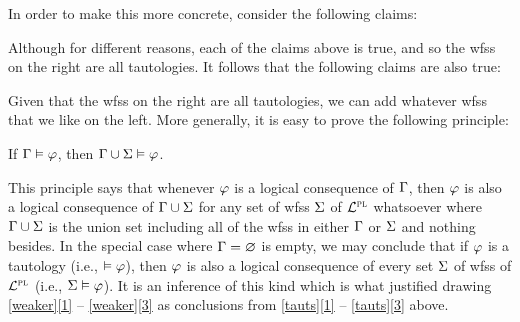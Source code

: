 
In order to make this more concrete, consider the following claims:

\begin{earg} \label{tauts}
\end{earg}

Although for different reasons, each of the claims above is true, and so the wfss on the right are all tautologies.
It follows that the following claims are also true:

\begin{earg} \label{weaker}
\end{earg}

Given that the wfss on the right are all tautologies, we can add whatever wfss that we like on the left.
More generally, it is easy to prove the following principle:

\begin{Lthm}[\it Weakening] \label{lemma:weakening}
  If $\Gamma \vDash \varphi$, then $\Gamma \cup \Sigma \vDash \varphi$.
\end{Lthm}


This principle says that whenever $\varphi$ is a logical consequence of $\Gamma$, then $\varphi$ is also a logical consequence of $\Gamma \cup \Sigma$ for any set of wfss $\Sigma$ of $\mathcal{L}^{\textsc{pl}}$ whatsoever where $\Gamma \cup \Sigma$ is the union set including all of the wfss in either $\Gamma$ or $\Sigma$ and nothing besides. 
In the special case where $\Gamma = \varnothing$ is empty, we may conclude that if $\varphi$ is a tautology (i.e., $\vDash \varphi$), then $\varphi$ is also a logical consequence of every set $\Sigma$ of wfss of $\mathcal{L}^{\textsc{pl}}$ (i.e., $\Sigma \vDash \varphi$).
It is an inference of this kind which is what justified drawing \ref{weaker}\ref{1} -- \ref{weaker}\ref{3} as conclusions from \ref{tauts}\ref{1} -- \ref{tauts}\ref{3} above.

